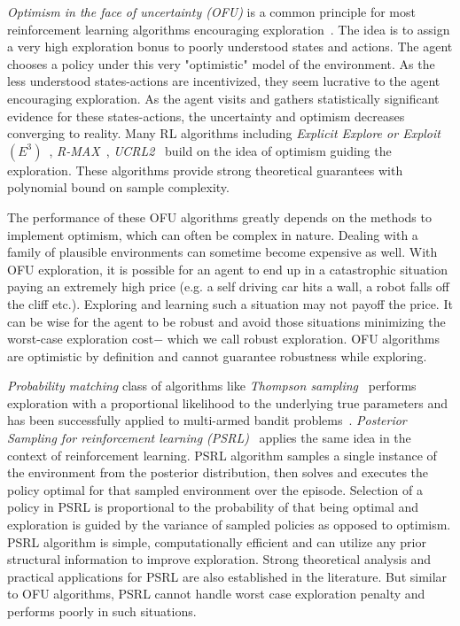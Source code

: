 \documentclass{article}
\theoremstyle{plain}
\theoremstyle{definition}
\begin{document}
\emph{Optimism in the face of uncertainty (OFU)} is a common principle for most reinforcement learning algorithms encouraging exploration~\citep{Jaksch2010,Brafman2001,Kearns1998a}. The idea is to assign a very high exploration bonus to poorly understood states and actions. The agent chooses a policy under this very "optimistic" model of the environment. As the less understood states-actions are incentivized, they seem lucrative to the agent encouraging exploration. As the agent visits and gathers statistically significant evidence for these states-actions, the uncertainty and optimism decreases converging to reality. Many RL algorithms including \emph{Explicit Explore or Exploit $(E^3)$}~\citep{Kearns1998a}, \emph{R-{\ssmall MAX}}~\cite{Brafman2001}, \emph{UCRL2}~\cite{Auer2006} build on the idea of optimism guiding the exploration. These algorithms provide strong theoretical guarantees with polynomial bound on sample complexity. 

The performance of these OFU algorithms greatly depends on the methods to implement optimism, which can often be complex in nature. Dealing with a family of plausible environments can sometime become expensive as well. With OFU exploration, it is possible for an agent to end up in a catastrophic situation paying an extremely high price (e.g. a self driving car hits a wall, a robot falls off the cliff etc.). Exploring and learning such a situation may not payoff the price. It can be wise for the agent to be robust and avoid those situations minimizing the worst-case exploration cost$-$ which we call robust exploration. OFU algorithms are optimistic by definition and cannot guarantee robustness while exploring.

\emph{Probability matching} class of algorithms like \emph{Thompson sampling}~\citep{Thompson1933} performs exploration with a proportional likelihood to the underlying true parameters and has been successfully applied to multi-armed bandit problems~\citep{Agrawal2012,Agrawal2011}. \emph{Posterior Sampling for reinforcement learning (PSRL)}~\citep{Osband2016, Osband2013, Strens2002} applies the same idea in the context of reinforcement learning. PSRL algorithm samples a single instance of the environment from the posterior distribution, then solves and executes the policy optimal for that sampled environment over the episode. Selection of a policy in PSRL is proportional to the probability of that being optimal and exploration is guided by the variance of sampled policies as opposed to optimism. PSRL algorithm is simple, computationally efficient and can utilize any prior structural information to improve exploration. Strong theoretical analysis and practical applications for PSRL are also established in the literature. But similar to OFU algorithms, PSRL cannot handle worst case exploration penalty and performs poorly in such situations.
\end{document}
